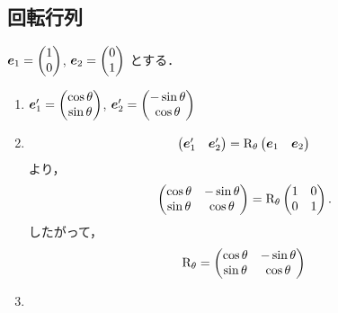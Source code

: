 \subsection{回転行列}
  $\boldsymbol{e}_1 = \begin{pmatrix} 1 \\ 0 \end{pmatrix}$,
  $\boldsymbol{e}_2 = \begin{pmatrix} 0 \\ 1 \end{pmatrix}$
  とする．
  \begin{enumerate}[label=(\roman*)]
    \item $\boldsymbol{e}'_1 = \begin{pmatrix} \cos\theta \\ \sin\theta \end{pmatrix}$,
      $\boldsymbol{e}'_2 = \begin{pmatrix} -\sin\theta \\ \cos\theta \end{pmatrix}$
    \item 
      \begin{equation}
        \begin{pmatrix} \boldsymbol{e}'_1 & \boldsymbol{e}'_2 \end{pmatrix}
        = \mathrm{R}_{\theta} \begin{pmatrix} \boldsymbol{e}_1 & \boldsymbol{e}_2 \end{pmatrix}
      \end{equation}
      より，
      \begin{equation}
        \begin{pmatrix}
          \cos\theta & -\sin\theta \\
          \sin\theta & \cos\theta
        \end{pmatrix}
        = \mathrm{R}_{\theta}
        \begin{pmatrix}
          1 & 0 \\
          0 & 1
        \end{pmatrix}.
      \end{equation}
      したがって，
      \begin{equation}
        \mathrm{R}_\theta =
          \begin{pmatrix}
            \cos\theta & -\sin\theta \\
            \sin\theta & \cos\theta
          \end{pmatrix}
      \end{equation}
    \item

\end{enumerate}
